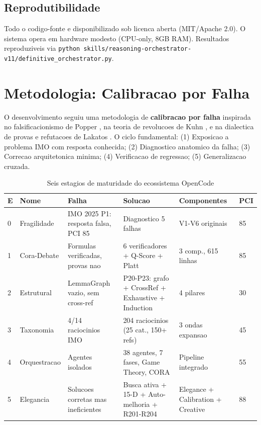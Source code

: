 \documentclass[5p]{elsarticle}
\begin{document}
\subsection{Reprodutibilidade}

Todo o codigo-fonte e disponibilizado sob licenca aberta (MIT/Apache 2.0). O
sistema opera em hardware modesto (CPU-only, 8GB RAM). Resultados reproduziveis
via \texttt{python skills/reasoning-orchestrator-v11/definitive\_orchestrator.py}.

\section{Metodologia: Calibracao por Falha}

O desenvolvimento seguiu uma metodologia de \textbf{calibracao por falha}
inspirada no falsificacionismo de Popper \cite{popper1959}, na teoria de
revolucoes de Kuhn \cite{kuhn1962}, e na dialectica de provas e refutacoes
de Lakatos \cite{lakatos1976}. O ciclo fundamental: (1) Exposicao a problema
IMO com resposta conhecida; (2) Diagnostico anatomico da falha; (3) Correcao
arquitetonica minima; (4) Verificacao de regressao; (5) Generalizacao cruzada.

\begin{landscape}
\begin{table}[H]
\centering
\caption{Seis estagios de maturidade do ecossistema OpenCode}
\label{tab:stages}
\small
\begin{tabular}{p{0.5cm}p{2cm}p{3cm}p{3.5cm}p{3cm}p{2cm}}
\toprule
\textbf{E} & \textbf{Nome} & \textbf{Falha} & \textbf{Solucao} & \textbf{Componentes} & \textbf{PCI}\\
\midrule
0 & Fragilidade & IMO 2025 P1: resposta falsa, PCI 85 & Diagnostico 5 falhas & V1-V6 originais & 85\\
\rowcolor{redbg}
1 & Cora-Debate & Formulas verificadas, provas nao & 6 verificadores + Q-Score + Platt & 3 comp., 615 linhas & 85\\
2 & Estrutural & LemmaGraph vazio, sem cross-ref & P20-P23: grafo + CrossRef + Exhaustive + Induction & 4 pilares & 30\\
\rowcolor{yellowbg}
3 & Taxonomia & 4/14 raciocinios IMO & 204 raciocinios (25 cat., 150+ refs) & 3 ondas expansao & 45\\
4 & Orquestracao & Agentes isolados & 38 agentes, 7 fases, Game Theory, CORA & Pipeline integrado & 55\\
\rowcolor{greenbg}
5 & Elegancia & Solucoes corretas mas ineficientes & Busca ativa + 15-D + Auto-melhoria + R201-R204 & Elegance + Calibration + Creative & 88\\
\bottomrule
\end{tabular}
\end{table}
\end{landscape}
\end{document}
